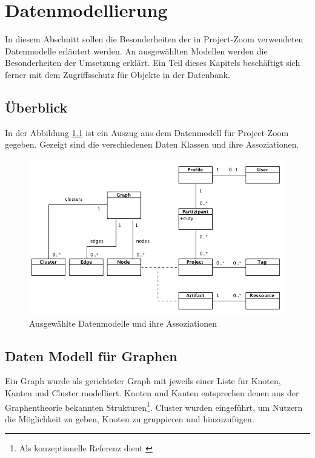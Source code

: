 \chapter{Datenmodellierung}
\label{sec:model}
In diesem Abschnitt sollen die Besonderheiten der in Project-Zoom verwendeten Datenmodelle erläutert werden. An ausgewählten Modellen werden die Besonderheiten der Umsetzung erklärt. Ein Teil dieses Kapitels beschäftigt sich ferner mit dem Zugriffsschutz für Objekte in der Datenbank.

\section{Überblick}

In der Abbildung \ref{fig:models} ist ein Auszug aus dem Datenmodell für Project-Zoom gegeben. Gezeigt sind die verschiedenen Daten Klassen und ihre Assoziationen. 

\begin{figure}[h]  
  \centering     
  \includegraphics[width=1.0\textwidth]{img/models.png}  
   \caption{Ausgewählte Datenmodelle und ihre Assoziationen}
  \label{fig:models} 
\end{figure}

\section{Daten Modell für Graphen}
Ein Graph wurde als gerichteter Graph mit jeweils einer Liste für Knoten, Kanten und Cluster modelliert. Knoten und Kanten entsprechen denen aus der Graphentheorie bekannten Strukturen\footnote{Als konzeptionelle Referenz dient \cite[p.~531]{corman}}.  Cluster wurden eingeführt, um Nutzern die Möglichkeit zu geben, Knoten zu gruppieren und  hinzuzufügen.

